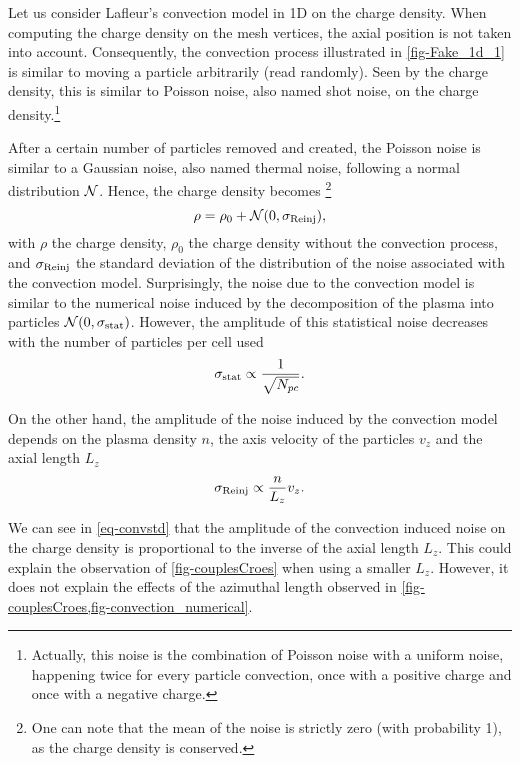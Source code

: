     Let us consider Lafleur's convection model in \ac{1D} on the charge density.
    When computing the charge density on the mesh vertices, the axial position is not taken into account.
    Consequently, the convection process illustrated in \cref{fig-Fake_1d_1} is similar to moving a particle arbitrarily (read randomly).
    Seen by the charge density, this is similar to Poisson noise, also named shot noise, on the charge density.\footnote{Actually, this noise is the combination of Poisson noise with a uniform noise, happening twice for every particle convection, once with a positive charge and once with a negative charge.}

    After a certain number of particles removed and created, the Poisson noise is similar to a Gaussian noise, also named thermal noise, following a normal distribution $\mathcal{N}$. 
    Hence, the charge density becomes \footnote{One can note that the mean of the noise is strictly zero (with probability 1), as the charge density is conserved.}
    \begin{equation} \label{eq-rhonoise}
      \rho = \rho_0 + \mathcal{N}(0, \sigma_{\rm Reinj}),
    \end{equation}
    with $\rho$ the charge density, $\rho_0$ the charge density without the convection process, and $\sigma_{\rm Reinj}$ the standard deviation of the distribution of the noise associated with the convection model.
    Surprisingly, the noise due to the convection model is similar to the numerical noise induced by the decomposition of the plasma into particles $\mathcal{N}(0, \sigma_{\rm stat})$.
    However, the amplitude of this statistical noise decreases with the number of particles per cell used
    \begin{equation*} \label{eq-statistical}
     \sigma_{\rm stat} \propto \frac{1}{\sqrt{N_{pc}}}.
    \end{equation*}

    On the other hand, the amplitude of the noise induced by the convection model depends on the plasma density $n$, the axis velocity of the particles $v_z$ and the axial length $L_z$
    \begin{equation} \label{eq-convstd}
     \sigma_{\rm Reinj} \propto \frac{n}{L_z} v_z.
    \end{equation}

    We can see in \cref{eq-convstd} that the amplitude of the convection induced noise on the charge density is proportional to the inverse of the axial length $L_z$.
    This could explain the observation of \cref{fig-couplesCroes} when using a smaller $L_z$.
    However, it does not explain the effects of the azimuthal length observed in \cref{fig-couplesCroes,fig-convection_numerical}.

